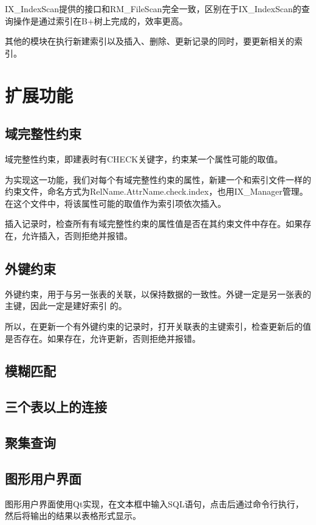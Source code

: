 IX\_IndexScan提供的接口和RM\_FileScan完全一致，区别在于IX\_IndexScan的查询操作是通过索引在B+树上完成的，效率更高。

其他的模块在执行新建索引以及插入、删除、更新记录的同时，要更新相关的索引。

\section{扩展功能}

\subsection{域完整性约束}
域完整性约束，即建表时有CHECK关键字，约束某一个属性可能的取值。

为实现这一功能，我们对每个有域完整性约束的属性，新建一个和索引文件一样的约束文件，命名方式为RelName.AttrName.check.index，也用IX\_Manager管理。在这个文件中，将该属性可能的取值作为索引项依次插入。

插入记录时，检查所有有域完整性约束的属性值是否在其约束文件中存在。如果存在，允许插入，否则拒绝并报错。

\subsection{外键约束}
外键约束，用于与另一张表的关联，以保持数据的一致性。外键一定是另一张表的主键，因此一定是建好索引
的。

所以，在更新一个有外键约束的记录时，打开关联表的主键索引，检查更新后的值是否存在。如果存在，允许更新，否则拒绝并报错。

\subsection{模糊匹配}

\subsection{三个表以上的连接}

\subsection{聚集查询}

\subsection{图形用户界面}
图形用户界面使用Qt实现，在文本框中输入SQL语句，点击后通过命令行执行，然后将输出的结果以表格形式显示。
